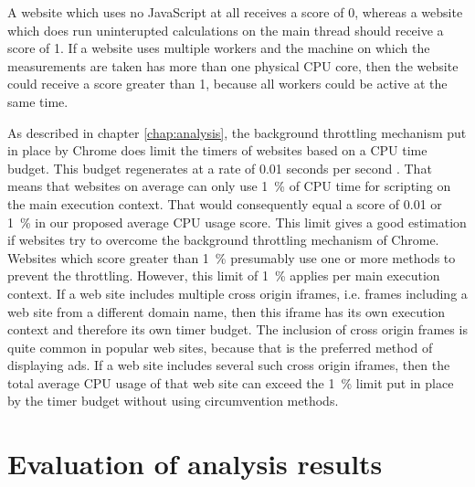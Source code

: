 \documentclass[
	ruledheaders=section,%
	class=report,%
	thesis={type=bachelor},%
	accentcolor=9c,%
	custommargins=true,%
	marginpar=false,%
	parskip=half-,%
	fontsize=11pt,%
]{tudapub}
\begin{document}
  A website which uses no JavaScript at all receives a score of 0, whereas a website which does run uninterupted calculations on the main thread should receive a score of 1. If a website uses multiple workers and the machine on which the measurements are taken has more than one physical CPU core, then the website could receive a score greater than 1, because all workers could be active at the same time.

  As described in chapter \ref{chap:analysis}, the background throttling mechanism put in place by Chrome does limit the timers of websites based on a CPU time budget. This budget regenerates at a rate of 0.01 seconds per second \cite{chrome-background-tabs}. That means that websites on average can only use 1~\% of CPU time for scripting on the main execution context. That would consequently equal a score of 0.01 or 1~\% in our proposed average CPU usage score. This limit gives a good estimation if websites try to overcome the background throttling mechanism of Chrome. Websites which score greater than 1~\% presumably use one or more methods to prevent the throttling. However, this limit of 1~\% applies per main execution context. If a web site includes multiple cross origin iframes, i.e. frames including a web site from a different domain name, then this iframe has its own execution context and therefore its own timer budget. The inclusion of cross origin frames is quite common in popular web sites, because that is the preferred method of displaying ads. If a web site includes several such cross origin iframes, then the total average CPU usage of that web site can exceed the 1~\% limit put in place by the timer budget without using circumvention methods.

  
  \section{Evaluation of analysis results}
\end{document}

